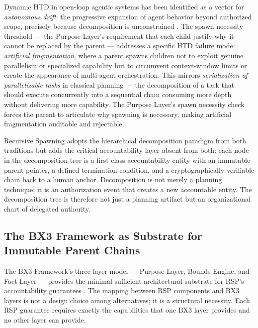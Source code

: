 Dynamic HTD in open-loop agentic systems has been identified as a vector for \emph{autonomous drift}: the progressive expansion of agent behavior beyond authorized scope, precisely because decomposition is unconstrained \cite{autoGPT2023}. The spawn necessity threshold --- the Purpose Layer's requirement that each child justify why it cannot be replaced by the parent --- addresses a specific HTD failure mode: \emph{artificial fragmentation}, where a parent spawns children not to exploit genuine parallelism or specialized capability but to circumvent context-window limits or create the appearance of multi-agent orchestration. This mirrors \emph{serialization of parallelizable tasks} in classical planning --- the decomposition of a task that should execute concurrently into a sequential chain consuming more depth without delivering more capability. The Purpose Layer's spawn necessity check forces the parent to articulate why spawning is necessary, making artificial fragmentation auditable and rejectable.

Recursive Spawning adopts the hierarchical decomposition paradigm from both traditions but adds the critical accountability layer absent from both: each node in the decomposition tree is a first-class accountability entity with an immutable parent pointer, a defined termination condition, and a cryptographically verifiable chain back to a human anchor. Decomposition is not merely a planning technique; it is an authorization event that creates a new accountable entity. The decomposition tree is therefore not just a planning artifact but an organizational chart of delegated authority.

\subsection{The BX3 Framework as Substrate for Immutable Parent Chains}

The BX3 Framework's three-layer model --- Purpose Layer, Bounds Engine, and Fact Layer --- provides the minimal sufficient architectural substrate for RSP's accountability guarantees \cite{bx3framework2026}. The mapping between RSP components and BX3 layers is not a design choice among alternatives; it is a structural necessity. Each RSP guarantee requires exactly the capabilities that one BX3 layer provides and no other layer can provide.

